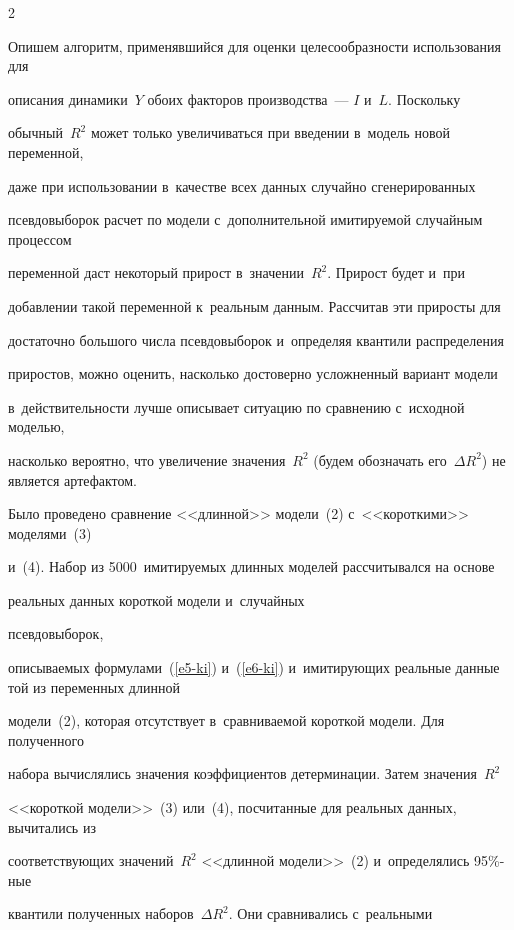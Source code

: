 \begin{multicols}{2}
  


  Опишем алгоритм, применявшийся для оценки целесообразности использования для 


описания динамики~$Y$ обоих факторов производства~--- $I$ и~$L$. Поскольку 


обычный~$R^2$ может только увеличиваться при введении в~модель новой переменной, 


даже при использовании в~качестве всех данных случайно сгенерированных 


псевдовыборок расчет по модели с~дополнительной имитируемой случайным процессом 


переменной даст некоторый прирост в~значении~$R^2$. Прирост будет и~при 


добавлении такой переменной к~реальным данным. Рассчитав эти приросты для 


достаточно большого числа псевдовыборок и~определяя квантили распределения 


приростов, можно оценить, насколько достоверно усложненный вариант модели 


в~действительности лучше описывает ситуацию по сравнению с~исходной моделью, 


насколько вероятно, что увеличение значения~$R^2$ (будем обозначать его~$\Delta 


R^2$) не является артефактом.


  


  Было проведено сравнение <<длинной>> модели~(2) с~<<короткими>> моделями~(3) 


и~(4). Набор из 5000~имитируемых длинных моделей рассчитывался на основе 


 реальных данных короткой модели и~случайных 


псевдовыборок,


описываемых формулами~(\ref{e5-ki}) и~(\ref{e6-ki}) и~имитирующих реальные данные той из переменных длинной 


модели~(2), которая отсутствует в~сравниваемой короткой модели. Для полученного 


набора вычислялись значения коэффициентов детерминации. Затем значения~$R^2$ 


<<короткой модели>>~(3) или~(4), посчитанные для реальных данных, вычитались из 


соответствующих значений~$R^2$ <<длинной модели>>~(2) и~определялись 95\%-ные 


квантили полученных наборов~$\Delta R^2$. Они сравнивались с~реальными 



\end{multicols}
